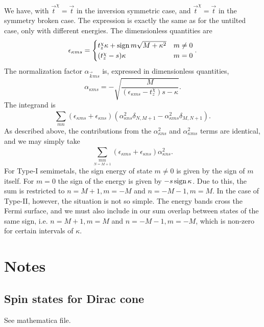 We have, with \( \vec{t}^{\chi } = \vec{t} \) in the inversion symmetric case, and \( \vec{t}^{\chi } = \vec{t} \) in the symmetry broken case.
The expression is exactly the same as for the untilted case, only with different energies.
The dimensionless quantities are
\begin{equation}
  \label{eq:95}
  \epsilon_{\kappa m s} =
  \begin{cases}
    t_z^{\chi } \kappa + \operatorname{sign}{m} \sqrt{M + \kappa ^2} & m \neq 0\\
    (t_z^{\chi } - s) \kappa & m = 0
  \end{cases}.
\end{equation}
The normalization factor \( \alpha _{\vec{k} m s} \) is, expressed in dimensionless quantities,
\begin{equation}
  \label{eq:96}
  \alpha _{\kappa m s} =
  -\sqrt{\frac{M}{(\epsilon_{\kappa  m s} - t_{z}^{\chi })s - \kappa }}.
\end{equation}
The integrand is
\begin{equation}
  \label{eq:97}
  \sum\limits_{mn}^{}
  (\epsilon_{\kappa m s} + \epsilon_{\kappa n s}) (\alpha_{\kappa n s}^2 \delta _{N, M+1}- \alpha_{\kappa m s}^2 \delta_{M, N+1}).
\end{equation}
As described above, the contributions from the \( \alpha _{\kappa n s}^2  \) and \( \alpha _{\kappa m s}^2 \) terms are identical, and we may simply take
\begin{equation}
  \label{eq:98}
  \sum\limits_{\underset{N=M+1}{mn}}^{}
  (\epsilon_{\kappa m s} + \epsilon_{\kappa n s}) \alpha_{\kappa n s}^2.
\end{equation}
For Type-I semimetals, the sign energy of state \( m \neq 0 \) is given by the sign of \( m \) itself.
For \( m = 0 \) the sign of the energy is given by \( -s \operatorname{sign}{\kappa } \).
Due to this, the sum is restricted to \( n=M+1, m=-M \) and \( n=-M-1, m=M \).
In the case of Type-II, however, the situation is not so simple.
The energy bands cross the Fermi surface, and we must also include in our sum overlap between states of the same sign, i.e. \( n=M+1, m=M \) and \( n=-M-1, m=-M \), which is non-zero for certain intervals of \( \kappa  \).


\section{Notes}
\subsection{Spin states for Dirac cone}
See mathematica file.


